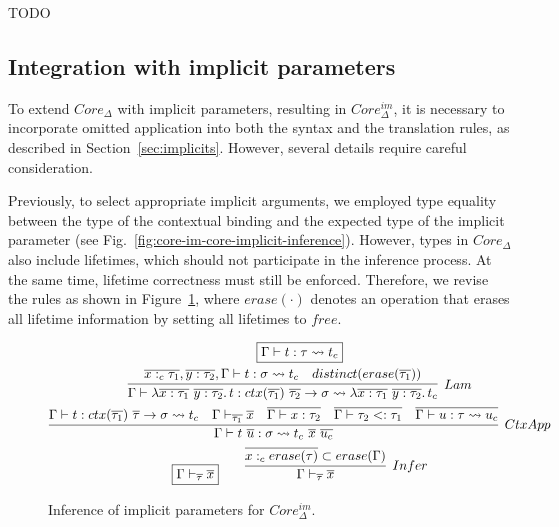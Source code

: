 \documentclass[acmsmall,review,screen]{acmart}
\newcommand{\mathframebox}[1]{\framebox{$\displaystyle #1$}}
\newcommand{\ap}{~}
\newcommand{\ctx}[1]{ctx(#1)~}
\newcommand{\step}{\rightsquigarrow}
\begin{document}
TODO %

\subsection{Integration with implicit parameters}

To extend $Core_\Delta$ with implicit parameters, resulting in $Core_\Delta^{im}$, it is necessary to incorporate omitted application into both the syntax and the translation rules, as described in Section~\ref{sec:implicits}.
However, several details require careful consideration.

Previously, to select appropriate implicit arguments, we employed type equality between the type of the contextual binding and the expected type of the implicit parameter (see Fig.\ \ref{fig:core-im-core-implicit-inference}).
However, types in $Core_\Delta$ also include lifetimes, which should not participate in the inference process.
At the same time, lifetime correctness must still be enforced.
Therefore, we revise the rules as shown in Figure~\ref{fig:core-im-delta-core-implicit-inference}, where $erase(\cdot)$ denotes an operation that erases all lifetime information by setting all lifetimes to $free$.

\begin{figure}
    \begin{gather*}
        \mathframebox{\Gamma\vdash t : \tau \step t_{c}} \\
        \infer[Lam]{
            \Gamma\vdash \lambda \overline{x : \tau_1} ~ \overline{y : \tau_2} \ldotp t : ctx(\overline{\tau_1}) ~ \overline{\tau_2} \to \sigma \step \lambda \overline{x : \tau_1} ~ \overline{y : \tau_2} \ldotp t_c
        }{
            \overline{x :_c \tau_1}, \overline{y : \tau_2}, \Gamma\vdash t : \sigma \step t_c &
            distinct(erase(\overline{\tau_1}))
        } \\
        \infer[CtxApp]{
            \Gamma\vdash t\ap\overline{u} : \sigma \step t_{c} \ap \overline{x}\ap\overline{u_{c}}
        }{
            \Gamma\vdash t : \ctx{\overline{\tau_1}} \overline{\tau} \to \sigma \step t_{c} &
            \Gamma\vdash_{\overline{\tau_1}}\overline{x} &
            \overline{\Gamma\vdash x : \tau_2} &
            \overline{\Gamma\vdash \tau_2 <: \tau_1} &
            \overline{\Gamma\vdash u : \tau \step u_{c}}
        } \\
        \mathframebox{\Gamma\vdash_{\overline{\tau}} \overline{x}}
        \text{\hspace{2em}}
        \infer[Infer]{\Gamma\vdash_{\overline{\tau}} \overline{x}}{\overline{x :_c erase(\tau)}\subset erase(\Gamma)}
    \end{gather*}
    \caption{Inference of implicit parameters for $Core_\Delta^{im}$.}
    \label{fig:core-im-delta-core-implicit-inference}
\end{figure}
\end{document}
